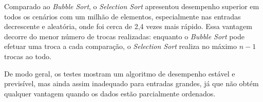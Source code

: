 \qquad Comparado ao \textit{Bubble Sort}, o \textit{Selection Sort} apresentou desempenho superior em todos os cenários com um milhão de elementos, especialmente nas entradas decrescente e aleatória, onde foi cerca de 2,4 vezes mais rápido. Essa vantagem decorre do menor número de trocas realizadas: enquanto o \textit{Bubble Sort} pode efetuar uma troca a cada comparação, o \textit{Selection Sort} realiza no máximo $n-1$ trocas ao todo.

\qquad De modo geral, os testes mostram um algoritmo de desempenho estável e previsível, mas ainda assim inadequado para entradas grandes, já que não obtém qualquer vantagem quando os dados estão parcialmente ordenados.

\FloatBarrier